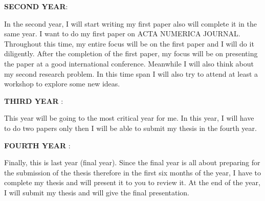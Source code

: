 \documentclass[PhD]{iitmdiss}
\begin{document}
{\textbf{SECOND YEAR}:
      
      In the second year, I will start writing my first paper also will complete it in the same year. I want to do my first paper on ACTA NUMERICA JOURNAL. Throughout this time, my entire focus will be on the first paper and I will do it diligently. After the completion of the first paper, my focus will be on presenting the paper at a good international conference. Meanwhile I will also think about my second research problem. In this time span I will also try to attend at least a workshop to explore some new ideas.
      \par
       
\textbf{THIRD YEAR} :


       This year will be going to the most critical year for me. In this year, I will have to do two papers only then I will be able to submit my thesis in the fourth year.

\par
\textbf{FOURTH YEAR} :

       Finally, this is last year (final year). Since the final year is all about preparing for the submission of the thesis therefore in the first six months of the year, I have to complete my thesis and will present it to you to review it. At the end of the year, I will submit my thesis and will give the final presentation.


}
\end{document}
